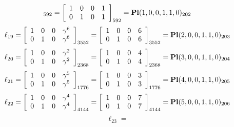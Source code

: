 \documentclass{article}
\begin{document}
{$$_{592}
=
\left[
\begin{array}{*{4}c}
1  & 0  & 0  & 1\\
0  & 1  & 0  & 1\\
\end{array}
\right]_{592}
={\rm\bf Pl}(1,0,0,1,1,0 )_{202}$$
$$
\ell_{19} = 
\left[
\begin{array}{*{4}{r}}
1 & 0 & 0 & \gamma^{6}\\
0 & 1 & 0 & \gamma^{6}\\
\end{array}
\right]
_{3552}
=
\left[
\begin{array}{*{4}c}
1  & 0  & 0  & 6\\
0  & 1  & 0  & 6\\
\end{array}
\right]_{3552}
={\rm\bf Pl}(2,0,0,1,1,0 )_{203}$$
$$
\ell_{20} = 
\left[
\begin{array}{*{4}{r}}
1 & 0 & 0 & \gamma^{2}\\
0 & 1 & 0 & \gamma^{2}\\
\end{array}
\right]
_{2368}
=
\left[
\begin{array}{*{4}c}
1  & 0  & 0  & 4\\
0  & 1  & 0  & 4\\
\end{array}
\right]_{2368}
={\rm\bf Pl}(3,0,0,1,1,0 )_{204}$$
$$
\ell_{21} = 
\left[
\begin{array}{*{4}{r}}
1 & 0 & 0 & \gamma^{5}\\
0 & 1 & 0 & \gamma^{5}\\
\end{array}
\right]
_{1776}
=
\left[
\begin{array}{*{4}c}
1  & 0  & 0  & 3\\
0  & 1  & 0  & 3\\
\end{array}
\right]_{1776}
={\rm\bf Pl}(4,0,0,1,1,0 )_{205}$$
$$
\ell_{22} = 
\left[
\begin{array}{*{4}{r}}
1 & 0 & 0 & \gamma^{4}\\
0 & 1 & 0 & \gamma^{4}\\
\end{array}
\right]
_{4144}
=
\left[
\begin{array}{*{4}c}
1  & 0  & 0  & 7\\
0  & 1  & 0  & 7\\
\end{array}
\right]_{4144}
={\rm\bf Pl}(5,0,0,1,1,0 )_{206}$$
$$
\ell_{23} = 
$$}
\end{document}
